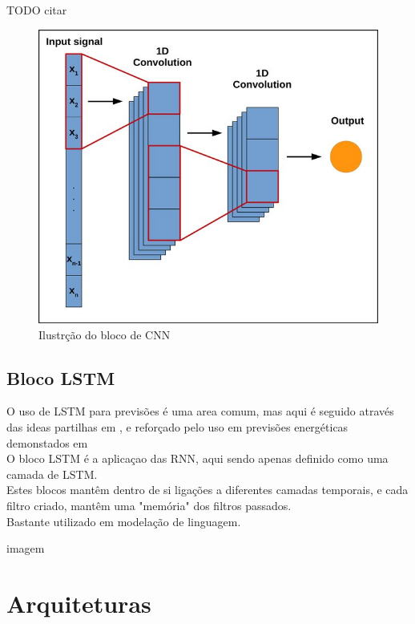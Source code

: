 TODO citar
\begin{figure}[H]
	\centering
	\includegraphics{Imagens/cnn_block.png}
	\caption{Ilustrção do bloco de CNN}
	\label{fig:cnn_block}
\end{figure}


\subsection{Bloco LSTM\label{se:lstm}}

O uso de LSTM para previsões é uma area comum, mas aqui é seguido através das ideas partilhas em \cite{Hewamalage2021}, e reforçado pelo uso em previsões energéticas demonstados em \cite{Costa2022} \\
O bloco LSTM é a aplicaçao das RNN, aqui sendo apenas definido como uma camada de LSTM. \\
Estes blocos mantêm dentro de si ligações a diferentes camadas temporais, e cada filtro criado, mantêm uma "memória" dos filtros passados. \\
Bastante utilizado em modelação de linguagem.

imagem


\section{Arquiteturas \label{se:arquitecturas}}

